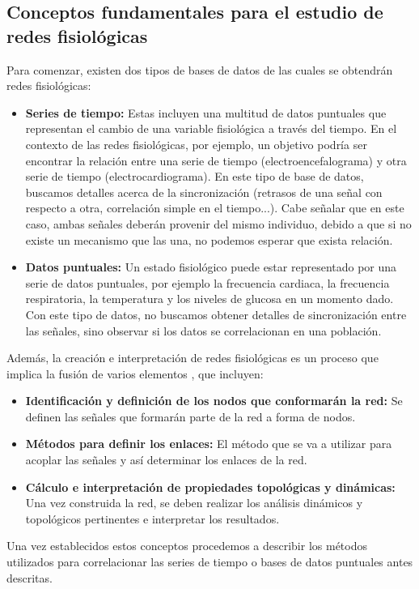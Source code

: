 \documentclass[twoside,twocolumn]{article}
\begin{document}
\subsection{Conceptos fundamentales para el estudio de redes fisiológicas}
Para comenzar, existen dos tipos de bases de datos de las cuales se obtendrán redes fisiológicas:
\begin{itemize}
  \item \textbf{Series de tiempo:} Estas incluyen una multitud de datos puntuales que representan el cambio de una variable fisiológica a través del tiempo.
  En el contexto de las redes fisiológicas, por ejemplo, un objetivo podría ser encontrar la relación entre una serie de tiempo (electroencefalograma) y otra serie de tiempo (electrocardiograma).
  En este tipo de base de datos, buscamos detalles acerca de la sincronización (retrasos de una señal con respecto a otra, correlación simple en el tiempo...).
  Cabe señalar que en este caso, ambas señales deberán provenir del mismo individuo, debido a que si no existe un mecanismo que las una, no podemos esperar que exista relación\cite{bashan2012network}.
  \item \textbf{Datos puntuales:} Un estado fisiológico puede estar representado por una serie de datos puntuales, por ejemplo la frecuencia cardiaca, la frecuencia respiratoria, la temperatura y los niveles de glucosa en un momento dado.
  Con este tipo de datos, no buscamos obtener detalles de sincronización entre las señales, sino observar si los datos se correlacionan en una población\cite{barajas2021physiological}.
\end{itemize}
Además, la creación e interpretación de redes fisiológicas es un proceso que implica la fusión de varios elementos \cite{barajas2021sex}, que incluyen:
\begin{itemize}
  \item \textbf{Identificación y definición de los nodos que conformarán la red:} Se definen las señales que formarán parte de la red a forma de nodos.
  \item \textbf{Métodos para definir los enlaces:} El método que se va a utilizar para acoplar las señales y así determinar los enlaces de la red.
  \item \textbf{Cálculo e interpretación de propiedades topológicas y dinámicas:} Una vez construida la red, se deben realizar los análisis dinámicos y topológicos pertinentes e interpretar los resultados.
\end{itemize}
Una vez establecidos estos conceptos procedemos a describir los métodos utilizados para correlacionar las series de tiempo o bases de datos puntuales antes descritas.
\end{document}
